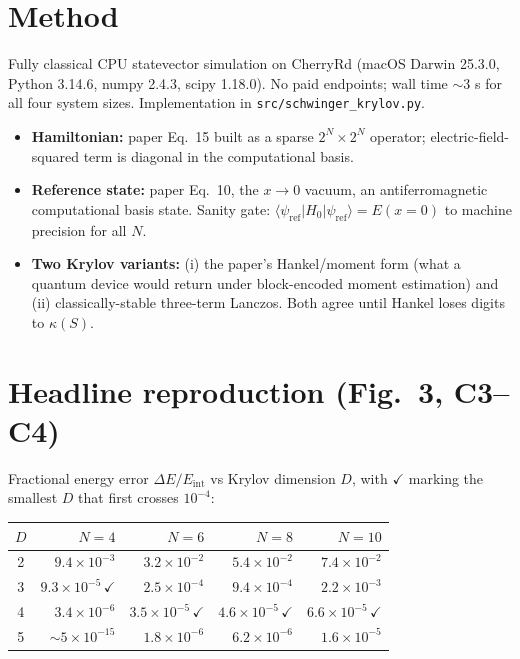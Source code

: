 \documentclass[11pt]{article}
\begin{document}
\section{Method}

Fully classical CPU statevector simulation on CherryRd (macOS Darwin 25.3.0,
Python 3.14.6, numpy 2.4.3, scipy 1.18.0).  No paid endpoints; wall time
$\sim 3$ s for all four system sizes.  Implementation in
\texttt{src/schwinger\_krylov.py}.

\begin{itemize}
  \item \textbf{Hamiltonian:} paper Eq.~15 built as a sparse $2^N \times 2^N$
    operator; electric-field-squared term is diagonal in the computational basis.
  \item \textbf{Reference state:} paper Eq.~10, the $x \to 0$ vacuum, an
    antiferromagnetic computational basis state.  Sanity gate:
    $\langle \psi_{\mathrm{ref}} | H_0 | \psi_{\mathrm{ref}} \rangle = E(x=0)$
    to machine precision for all $N$.
  \item \textbf{Two Krylov variants:} (i) the paper's Hankel/moment form (what a
    quantum device would return under block-encoded moment estimation) and
    (ii) classically-stable three-term Lanczos.  Both agree until Hankel loses
    digits to $\kappa(S)$.
\end{itemize}

\section{Headline reproduction (Fig.~3, C3--C4)}

Fractional energy error $\Delta E / E_{\mathrm{int}}$ vs Krylov dimension $D$,
with $\checkmark$ marking the smallest $D$ that first crosses $10^{-4}$:

\begin{center}
\begin{tabular}{crrrr}
\toprule
$D$ & $N{=}4$ & $N{=}6$ & $N{=}8$ & $N{=}10$ \\
\midrule
2  & $9.4\!\times\!10^{-3}$ & $3.2\!\times\!10^{-2}$ & $5.4\!\times\!10^{-2}$ & $7.4\!\times\!10^{-2}$ \\
3  & $9.3\!\times\!10^{-5}\,\checkmark$ & $2.5\!\times\!10^{-4}$ & $9.4\!\times\!10^{-4}$ & $2.2\!\times\!10^{-3}$ \\
4  & $3.4\!\times\!10^{-6}$ & $3.5\!\times\!10^{-5}\,\checkmark$ & $4.6\!\times\!10^{-5}\,\checkmark$ & $6.6\!\times\!10^{-5}\,\checkmark$ \\
5  & $\sim\!5\!\times\!10^{-15}$ & $1.8\!\times\!10^{-6}$ & $6.2\!\times\!10^{-6}$ & $1.6\!\times\!10^{-5}$ \\
\bottomrule
\end{tabular}
\end{center}
\end{document}
